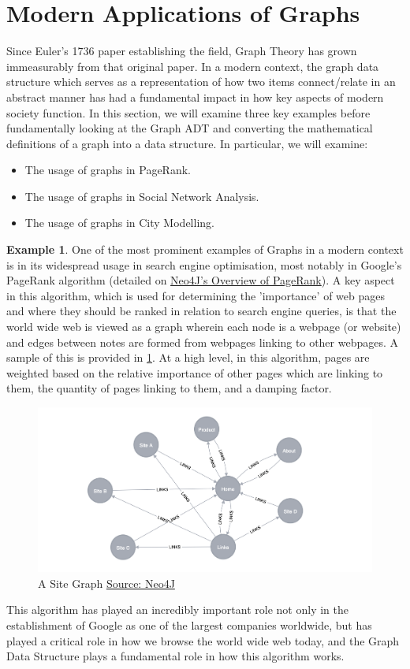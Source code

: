 \documentclass[11pt,reqno]{amsart}
\theoremstyle{definition}
\newtheorem{example}[thm]{Example}
\numberwithin{equation}{section}
\begin{document}
\pagebreak
\section{Modern Applications of Graphs}
\noindent Since Euler's 1736 paper establishing the field, Graph Theory has grown immeasurably from that original paper. In a modern context, the graph data structure which serves as a representation of how two items connect/relate in an abstract manner has had a fundamental impact in how key aspects of modern society function. In this section, we will examine three key examples before fundamentally looking at the Graph ADT and converting the mathematical definitions of a graph into a data structure. In particular, we will examine:
\begin{itemize}
	\item The usage of graphs in PageRank.
	\item The usage of graphs in Social Network Analysis.
	\item The usage of graphs in City Modelling.
\end{itemize}

\begin{example}
	One of the most prominent examples of Graphs in a modern context is in its widespread usage in search engine optimisation, most notably in Google's PageRank algorithm (detailed on \href{https://neo4j.com/docs/graph-data-science/current/algorithms/page-rank}{Neo4J's Overview of PageRank}). A key aspect in this algorithm, which is used for determining the 'importance' of web pages and where they should be ranked in relation to search engine queries, is that the world wide web is viewed as a graph wherein each node is a webpage (or website) and edges between notes are formed from webpages linking to other webpages. A sample of this is provided in \ref{fig:SiteGraph}. At a high level, in this algorithm, pages are weighted based on the relative importance of other pages which are linking to them, the quantity of pages linking to them, and a damping factor. 
	\begin{figure}[h!]
		\centering
		\includegraphics[width=0.8\linewidth]{page-rank}
		\caption{A Site Graph \href{https://neo4j.com/docs/graph-data-science/current/algorithms/page-rank}{Source: Neo4J}}
		\label{fig:SiteGraph}
	\end{figure}
	\noindent This algorithm has played an incredibly important role not only in the establishment of Google as one of the largest companies worldwide, but has played a critical role in how we browse the world wide web today, and the Graph Data Structure plays a fundamental role in how this algorithm works.
\end{example}
\end{document}
